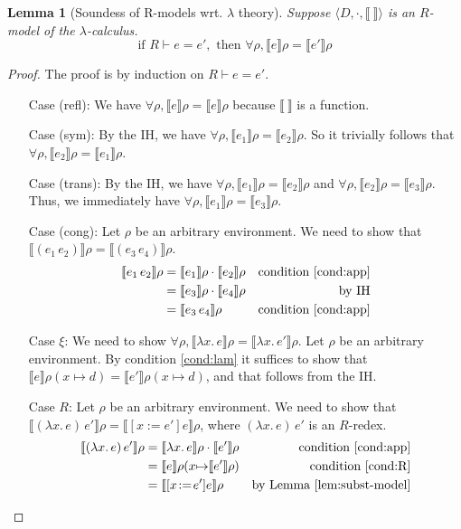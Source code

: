 \documentclass{tufte-handout}
\newcommand{\SEM}[1]{\llbracket #1 \rrbracket}
\newcommand{\LAM}[1]{\lambda #1.\,}
\newcommand{\APP}[0]{\,}
\newcommand{\by}[0]{\!:=\!}
\newcommand{\ext}[3]{#3(#1{\mapsto}#2)}
\newtheorem{lemma}[theorem]{Lemma}
\begin{document}
\begin{lemma}[Soundess of R-models wrt. $\lambda$ theory]
  Suppose $\langle D,\cdot,\SEM{\ }\rangle$ is an $R$-model of the
  $\lambda$-calculus.
  \[
  \text{if } R \vdash e = e', \text{ then } \forall \rho, \SEM{e}\rho = \SEM{e'}\rho
  \]
\end{lemma}
\begin{proof}
  The proof is by induction on $R \vdash e = e'$.
  \begin{itemize}
  \item[Case (refl):] We have $\forall \rho, \SEM{e}\rho = \SEM{e}\rho$
    because $\SEM{\ }$ is a function.
    
  \item[Case (sym):]
    By the IH, we have $\forall \rho, \SEM{e_1}\rho = \SEM{e_2}\rho$.
    So it trivially follows that $\forall \rho, \SEM{e_2}\rho = \SEM{e_1}\rho$.
    
  \item[Case (trans):]
    By the IH, we have $\forall \rho, \SEM{e_1}\rho = \SEM{e_2}\rho$
    and $\forall \rho, \SEM{e_2}\rho = \SEM{e_3}\rho$.
    Thus, we immediately have $\forall \rho, \SEM{e_1}\rho = \SEM{e_3}\rho$.
    
  \item[Case (cong):]
    Let $\rho$ be an arbitrary environment.
    We need to show that $\SEM{(e_1\APP e_2)}\rho = \SEM{(e_3\APP e_4)}\rho$.
    \begin{align*}
      \SEM{e_1\APP e_2}\rho &= \SEM{e_1}\rho \cdot \SEM{e_2}\rho & \text{condition \ref{cond:app}}\\
        &= \SEM{e_3}\rho \cdot \SEM{e_4}\rho & \text{by IH}\\
        &= \SEM{e_3\APP e_4}\rho & \text{condition \ref{cond:app}}
    \end{align*}
    
  \item[Case $\xi$:]
    We need to show $\forall \rho, \SEM{\LAM{x}e}\rho = \SEM{\LAM{x}e'}\rho$.
    Let $\rho$ be an arbitrary environment.
    By condition \ref{cond:lam} it suffices to show that
    $\SEM{e}\ext{x}{d}{\rho} = \SEM{e'}\ext{x}{d}{\rho}$,
    and that follows from the IH.

  \item[Case $R$:]
    Let $\rho$ be an arbitrary environment.
    We need to show that
    $\SEM{(\LAM{x}e)\APP e'}\rho = \SEM{[x\by e']e}\rho$,
    where $(\LAM{x}e)\APP e'$ is an $R$-redex.
    \begin{align*}
      \SEM{(\LAM{x}e)\APP e'}\rho &=
      \SEM{\LAM{x}e}\rho \cdot \SEM{e'}\rho & \text{condition \ref{cond:app}} \\
      &= \SEM{e} \ext{x}{\SEM{e'}\rho}{\rho} & \text{condition \ref{cond:R}} \\
      &= \SEM{[x\by e']e}\rho & \text{by Lemma~\ref{lem:subst-model}}
    \end{align*}
    
  \end{itemize}
\end{proof}
\end{document}
